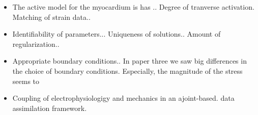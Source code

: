 \begin{itemize}
\item The active model for the myocardium is has .. Degree of
  tranverse activation. Matching of strain data..
\item Identifiability of parameters... Uniqueness of
  solutions.. Amount of regularization..
\item Appropriate boundary conditions.. In paper three we saw big
  differences in the choice of boundary conditions. Especially, the
  magnitude of the stress seems to 
\item Coupling of electrophysiologigy and mechanics in an
  ajoint-based. data assimilation framework. 
\end{itemize}
 


